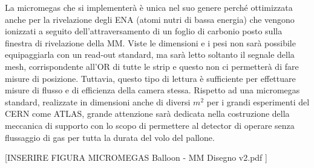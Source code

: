 La micromegas che si implementerà è unica nel suo genere perché ottimizzata anche per la rivelazione degli ENA (atomi nutri di bassa energia) che vengono ionizzati a seguito dell'attraversamento di un foglio di carbonio posto sulla finestra di rivelazione della MM. 
Viste le dimensioni e i pesi non sarà possibile equipaggiarla con un read-out standard, ma sarà letto soltanto il segnale della mesh, corrispondente all’OR di tutte le strip e questo non ci permetterà di fare misure di posizione. Tuttavia, questo tipo di lettura è sufficiente per effettuare misure di flusso e di efficienza della camera stessa. Rispetto ad una micromegas standard, realizzate in dimensioni anche di diversi $m^2$ per i grandi esperimenti del CERN come ATLAS, grande attenzione sarà dedicata nella costruzione della meccanica di supporto con lo scopo di permettere al detector di operare senza flussaggio di gas per tutta la durata del volo del pallone. 
 
[INSERIRE FIGURA MICROMEGAS Balloon - MM Disegno v2.pdf ]

